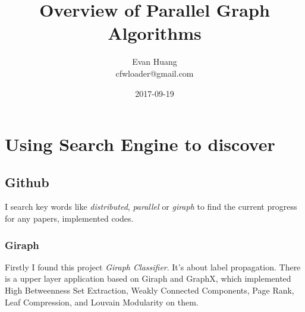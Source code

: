\documentclass{article}
\title{Overview of Parallel Graph Algorithms}
\date{2017-09-19}
\author{Evan Huang \\ cfwloader@gmail.com}
\begin{document}


	\tableofcontents


	\newpage

	\section{Using Search Engine to discover}
	\subsection{Github}
	I search key words like \emph{distributed}, \emph{parallel} or \emph{giraph} to find the current progress for any papers, implemented codes.
	\subsubsection{Giraph}
	Firstly I found this project \emph{Giraph Classifier}\cite{giraph_classifier}. It's about label propagation.
	\newline
	There is a upper layer application\cite{dis_graph_ana} based on Giraph and GraphX, which implemented High Betweenness Set Extraction, Weakly Connected Components, Page Rank, Leaf Compression, and Louvain Modularity on them.
\end{document}
